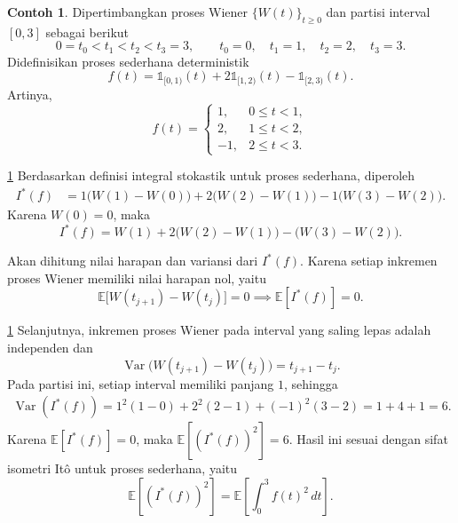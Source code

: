 \documentclass[aspectratio=169,11pt]{beamer}
\theoremstyle{definition}
\newtheorem{contoh}{Contoh}
\newcommand{\myref}[1]{\hyperref[#1]{\nameCref{#1} \ref*{#1}}}
\begin{document}
\begin{frame}{\insertsection}{\insertsubsection}
  \begin{contoh}\label{cth:5.4}
    Dipertimbangkan proses Wiener $\{W(t)\}_{t\geq 0}$ dan partisi interval $[0,3]$
    sebagai berikut
    \[
      0=t_0<t_1<t_2<t_3=3,
      \qquad
      t_0=0,\quad t_1=1,\quad t_2=2,\quad t_3=3.
    \]
    Didefinisikan proses sederhana deterministik
    \[
      f(t)
      =
      \mathds{1}_{[0,1)}(t)
      +2\mathds{1}_{[1,2)}(t)
      -\mathds{1}_{[2,3)}(t).
    \]
    Artinya,
    \[
      f(t)=
      \begin{cases}
        1,  & 0\leq t<1, \\
        2,  & 1\leq t<2, \\
        -1, & 2\leq t<3.
      \end{cases}
    \]
  \end{contoh}
\end{frame}
\begin{frame}{\insertsection}{\insertsubsection}
  \begin{exampleblock}{\myref{cth:5.4}}
    Berdasarkan definisi integral stokastik untuk proses sederhana, diperoleh
    \[
      \begin{aligned}
        I^*(f)
         & =
        1\bigl(W(1)-W(0)\bigr)
        +2\bigl(W(2)-W(1)\bigr)
        -1\bigl(W(3)-W(2)\bigr).
      \end{aligned}
    \]
    Karena $W(0)=0$, maka
    \[
      I^*(f)
      =
      W(1)+2\bigl(W(2)-W(1)\bigr)-\bigl(W(3)-W(2)\bigr).
    \]

    Akan dihitung nilai harapan dan variansi dari $I^*(f)$. Karena setiap inkremen
    proses Wiener memiliki nilai harapan nol, yaitu
    \[
      \mathbb{E}\bigl[W(t_{j+1})-W(t_j)\bigr]=0 \implies
      \mathbb{E}[I^*(f)]=0.
    \]
  \end{exampleblock}
\end{frame}

\begin{frame}{\insertsection}{\insertsubsection}
  \begin{exampleblock}{\myref{cth:5.4}}
    Selanjutnya, inkremen proses Wiener pada interval yang saling lepas adalah
    independen dan
    \[
      \operatorname{Var}\bigl(W(t_{j+1})-W(t_j)\bigr)=t_{j+1}-t_j.
    \]
    Pada partisi ini, setiap interval memiliki panjang $1$, sehingga
    \[
      \begin{aligned}
        \operatorname{Var}(I^*(f))
        =
        1^2(1-0)+2^2(2-1)+(-1)^2(3-2)  =
        1+4+1                          =
        6.
      \end{aligned}
    \]
    Karena $\mathbb{E}[I^*(f)]=0$, maka
    $
      \mathbb{E}\left[(I^*(f))^2\right]=6.
    $ Hasil ini sesuai dengan sifat isometri Itô untuk proses sederhana, yaitu
    \[
      \mathbb{E}\left[(I^*(f))^2\right]
      =
      \mathbb{E}\left[\int_0^3 f(t)^2\,dt\right].
    \]
  \end{exampleblock}
\end{frame}
\end{document}

